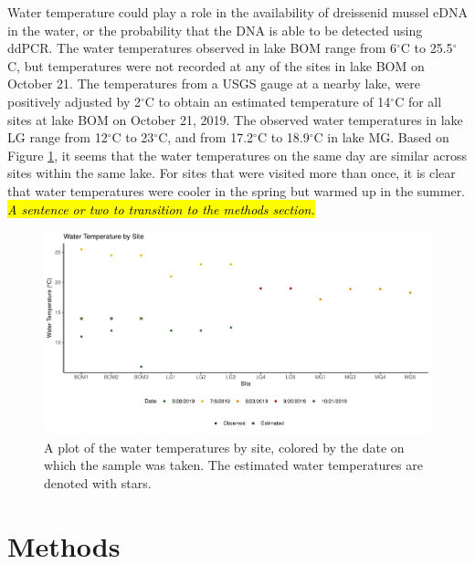 \documentclass[12pt]{article}\usepackage[]{graphicx}\usepackage[]{color}
\makeatletter
\def\maxwidth{ %
  \ifdim\Gin@nat@width>\linewidth
    \linewidth
  \else
    \Gin@nat@width
  \fi
}
\newenvironment{knitrout}{}{} %
\def\maxwidth{ %
  \ifdim\Gin@nat@width>\linewidth
    \linewidth
  \else
    \Gin@nat@width
  \fi
}
\newenvironment{knitrout}{}{} %
\makeatother
\begin{document}
Water temperature could play a role in the availability of dreissenid mussel eDNA in the water, or the probability that the DNA is able to be detected using ddPCR. The water temperatures observed in lake BOM range from 6$^\circ$C to 25.5$^\circ$C, but temperatures were not recorded at any of the sites in lake BOM on October 21. The temperatures from a USGS gauge at a nearby lake, were positively adjusted by 2$^\circ$C to obtain an estimated temperature of 14$^\circ$C for all sites at lake BOM on October 21, 2019. The observed water temperatures in lake LG range from 12$^\circ$C to 23$^\circ$C, and from 17.2$^\circ$C to 18.9$^\circ$C in lake MG. Based on Figure \ref{fig:eDNA_temp}, it seems that the water temperatures on the same day are similar across sites within the same lake. For sites that were visited more than once, it is clear that water temperatures were cooler in the spring but warmed up in the summer. \hl{\textit{A sentence or two to transition to the methods section.}}

\begin{figure}[]
\begin{knitrout}
\color{fgcolor}

{\centering \includegraphics[width=\maxwidth]{figure/eDNA_visualization_temp-1} 

}



\end{knitrout}
\caption{A plot of the water temperatures by site, colored by the date on which the sample was taken. The estimated water temperatures are denoted with stars.}
\label{fig:eDNA_temp}
\end{figure}

\section{Methods}
\end{document}
